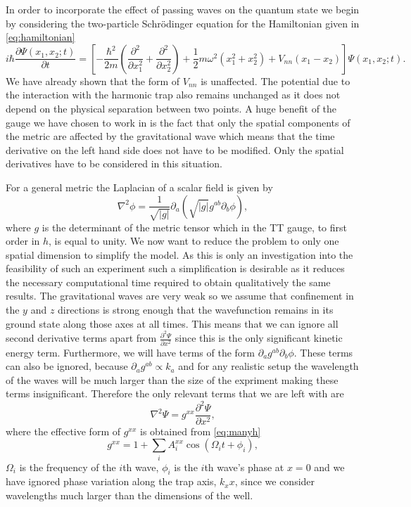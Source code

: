 In order to incorporate the effect of passing waves on the quantum
state we begin by considering the two-particle Schr\"{o}dinger
equation for the Hamiltonian given in \eqref{eq:hamiltonian}
\begin{equation}\label{eq:schrodinger}
i\hbar\frac{\partial \Psi(x_1, x_2; t)}{\partial t} = \left[
  -\frac{\hbar^2}{2m}\left( \frac{\partial^2}{\partial x_1^2} +
  \frac{\partial^2}{\partial x_2^2} \right) +
  \frac{1}{2}m\omega^2(x_1^2 + x_2^2) + V_{nn}(x_1-x_2)
  \right]\Psi(x_1, x_2; t).
\end{equation}
We have already shown that the form of $V_{nn}$ is unaffected. The
potential due to the interaction with the harmonic trap also remains
unchanged as it does not depend on the physical separation between two
points. A huge benefit of the gauge we have chosen to work in is the
fact that only the spatial components of the metric are affected by
the gravitational wave which means that the time derivative on the
left hand side does not have to be modified. Only the spatial
derivatives have to be considered in this situation.

For a general metric the Laplacian of a scalar field is given by
\begin{equation}\label{eq:laplacian}
\nabla^2\phi = \frac{1}{\sqrt{|g|}}\partial_a \left( \sqrt{|g|} g^{ab}
\partial_b\phi \right),
\end{equation}
where $g$ is the determinant of the metric tensor which in the TT
gauge, to first order in $h$, is equal to unity. We now want to reduce
the problem to only one spatial dimension to simplify the model. As
this is only an investigation into the feasibility of such an
experiment such a simplification is desirable as it reduces the
necessary computational time required to obtain qualitatively the same
results. The gravitational waves are very weak so we assume that
confinement in the $y$ and $z$ directions is strong enough that the
wavefunction remains in its ground state along those axes at all
times. This means that we can ignore all second derivative terms apart
from $\frac{\partial^2 \Psi}{\partial x^2}$ since this is the only
significant kinetic energy term. Furthermore, we will have terms of
the form $\partial_a g^{ab} \partial_b \phi$. These terms can also be
ignored, because $\partial_a g^{ab} \propto k_a$ and for any realistic
setup the wavelength of the waves will be much larger than the size of
the expriment making these terms insignificant. Therefore the only
relevant terms that we are left with are
\begin{equation}\label{eq:kinetic}
\nabla^2 \Psi = g^{xx}\frac{\partial^2 \Psi}{\partial x^2},
\end{equation}
where the effective form of $g^{xx}$ is obtained from \eqref{eq:manyh}
\begin{equation}
g^{xx} = 1 + \sum_i A^{xx}_i \cos(\Omega_i t + \phi_i),
\end{equation}
$\Omega_i$ is the frequency of the $i$th wave, $\phi_i$ is the $i$th
wave's phase at $x=0$ and we have ignored phase variation along the
trap axis, $k_x x$, since we consider wavelengths much larger than the
dimensions of the well.

